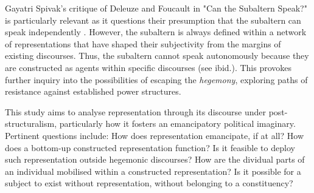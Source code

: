 

Gayatri Spivak's critique of Deleuze and Foucault in "Can the Subaltern Speak?" is particularly relevant as it questions their presumption that the subaltern can speak independently \parencite[543]{thomassen2017}. However, the subaltern is always defined within a network of representations that have shaped their subjectivity from the margins of existing discourses. Thus, the subaltern cannot speak autonomously because they are constructed as agents within specific discourses (see ibid.). This provokes further inquiry into the possibilities of escaping the \textit{hegemony}, exploring paths of resistance against established power structures.




%


This study aims to analyse representation through its discourse under post-structuralism, particularly how it fosters an emancipatory political imaginary. Pertinent questions include: How does representation emancipate, if at all? How does a bottom-up constructed representation function? Is it feasible to deploy such representation outside hegemonic discourses? How are the dividual parts of an individual mobilised within a constructed representation? Is it possible for a subject to exist without representation, without belonging to a constituency?


